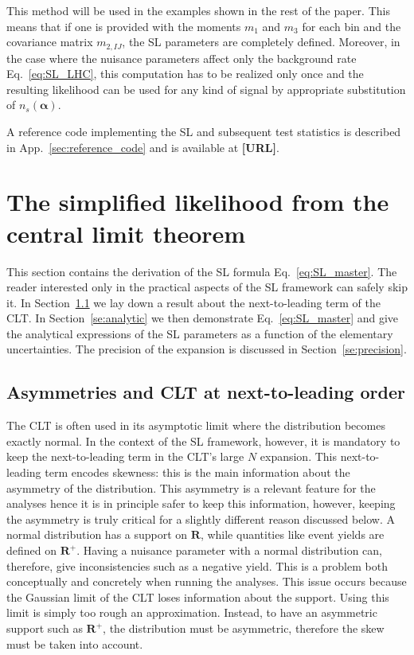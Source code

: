 \documentclass[11pt]{article}
\begin{document}
This method will be used in the examples shown in the rest of the paper. 
 This means that if one is provided with the moments $m_{1}$ and $m_{3}$ for each bin and the covariance matrix $m_{2,IJ}$, the SL parameters are completely defined. Moreover, in the case where the nuisance parameters affect only the background rate Eq.~\eqref{eq:SL_LHC}, this computation has to be realized only once and the resulting likelihood can be used for any kind of signal by appropriate substitution of $n_{s}(\bm{\alpha})$.

A reference code implementing the SL and subsequent test statistics is described in App.~\ref{sec:reference_code} and is available at \textbf{[URL]}.   




\section{The simplified likelihood from the central limit theorem}
\label{se:SL_theory}

This section contains the derivation of the SL formula Eq.~\eqref{eq:SL_master}.
The reader interested only in the practical aspects of the SL framework can safely skip it. In Section~\ref{se:skew_CLT} we lay down a  result about the next-to-leading term of the CLT. In Section~\ref{se:analytic} we then demonstrate Eq.~\eqref{eq:SL_master} and give the analytical expressions of the SL parameters as a function of the elementary uncertainties. The precision of the expansion is discussed in Section~\ref{se:precision}. 

\subsection{Asymmetries and CLT at next-to-leading order}
\label{se:skew_CLT}

The CLT is often used in its asymptotic limit where the distribution becomes exactly normal. In the context of the SL framework, however, it is mandatory to keep the next-to-leading  term in the CLT's large $N$ expansion. This next-to-leading term encodes skewness: this is the main information about the asymmetry of the distribution. This asymmetry is a relevant feature for the analyses hence it is in principle safer to keep this information, however, keeping the asymmetry is truly critical for a slightly different reason discussed below. A normal distribution has a support on $\mathbf{R}$, while quantities like event yields are defined on $\mathbf{R}^+$. Having a nuisance parameter with a normal distribution can, therefore, give inconsistencies such as a negative yield. This is a problem both conceptually and concretely when running the analyses. This issue occurs because the Gaussian limit of the CLT loses information about the support. Using this limit is simply too rough an approximation. Instead, to have an asymmetric support such as $\mathbf{R}^+$,  the distribution must be asymmetric, therefore the skew must be taken into account.
\end{document}
